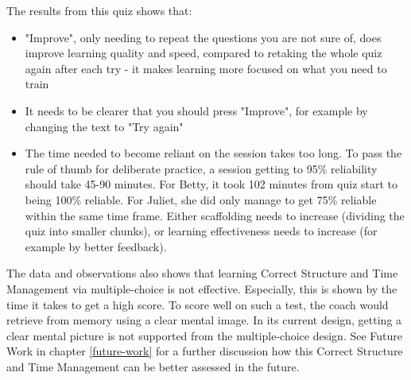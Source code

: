   The results from this quiz shows that:
  \begin{itemize}
  \item "Improve", only needing to repeat the questions you are not sure of, does improve learning quality and speed, compared to retaking the whole quiz again after each try - it makes learning more focused on what you need to train
  \item It needs to be clearer that you should press "Improve", for example by changing the text to "Try again"
  \item The time needed to become reliant on the session takes too long. To pass the rule of thumb for deliberate practice, a session getting to 95\% reliability should take 45-90 minutes. For Betty, it took 102 minutes from quiz start to being 100\% reliable. For Juliet, she did only manage to get 75\% reliable within the same time frame. Either scaffolding needs to increase (dividing the quiz into smaller chunks), or learning effectiveness needs to increase (for example by better feedback).
  \end{itemize}

The data and observations also shows that learning Correct Structure and Time Management via multiple-choice is not effective. Especially, this is shown by the time it takes to get a high score. To score well on such a test, the coach would retrieve from memory using a clear mental image. In its current design, getting a clear mental picture is not supported from the multiple-choice design. See Future Work in chapter \ref{future-work} for a further discussion how this Correct Structure and Time Management can be better assessed in the future.
